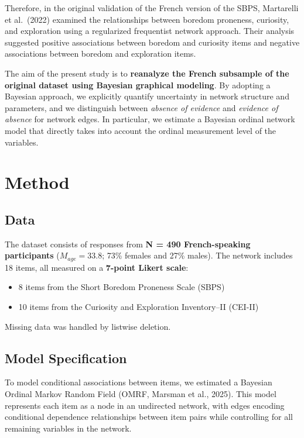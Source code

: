 \documentclass[
  letterpaper,
  DIV=11,
  numbers=noendperiod]{scrartcl}
\providecommand{\tightlist}{%
  \setlength{\itemsep}{0pt}\setlength{\parskip}{0pt}}
\begin{document}
Therefore, in the original validation of the French version of the SBPS,
Martarelli et al.~(2022) examined the relationships between boredom
proneness, curiosity, and exploration using a regularized frequentist
network approach. Their analysis suggested positive associations between
boredom and curiosity items and negative associations between boredom
and exploration items.

The aim of the present study is to \textbf{reanalyze the French
subsample of the original dataset using Bayesian graphical modeling}. By
adopting a Bayesian approach, we explicitly quantify uncertainty in
network structure and parameters, and we distinguish between
\emph{absence of evidence} and \emph{evidence of absence} for network
edges. In particular, we estimate a Bayesian ordinal network model that
directly takes into account the ordinal measurement level of the
variables.

\section{Method}\label{method}

\subsection{Data}\label{data}

The dataset consists of responses from \textbf{N = 490 French-speaking
participants} (\(M_{age} = 33.8\); 73\% females and 27\% males). The
network includes 18 items, all measured on a \textbf{7-point Likert
scale}:

\begin{itemize}
\tightlist
\item
  8 items from the Short Boredom Proneness Scale (SBPS)
\item
  10 items from the Curiosity and Exploration Inventory--II (CEI-II)
\end{itemize}

Missing data was handled by listwise deletion.

\subsection{Model Specification}\label{model-specification}

To model conditional associations between items, we estimated a Bayesian
Ordinal Markov Random Field (OMRF, Marsman et al., 2025). This model
represents each item as a node in an undirected network, with edges
encoding conditional dependence relationships between item pairs while
controlling for all remaining variables in the network.
\end{document}
